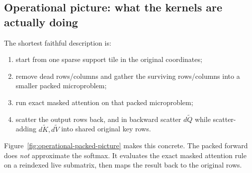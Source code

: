 \documentclass[11pt]{article}
\begin{document}
\subsection{Operational picture: what the kernels are actually doing}

The shortest faithful description is:
\begin{enumerate}[leftmargin=1.5em]
    \item start from one sparse support tile in the original coordinates;
    \item remove dead rows/columns and gather the surviving rows/columns into a
    smaller packed microproblem;
    \item run exact masked attention on that packed microproblem;
    \item scatter the output rows back, and in backward scatter
    \(d\widetilde Q\) while scatter-adding \(d\widetilde K,d\widetilde V\) into
    shared original key rows.
\end{enumerate}

Figure~\ref{fig:operational-packed-picture} makes this concrete. The packed
forward does \emph{not} approximate the softmax. It evaluates the exact masked
attention rule on a reindexed live submatrix, then maps the result back to the
original rows.
\end{document}
